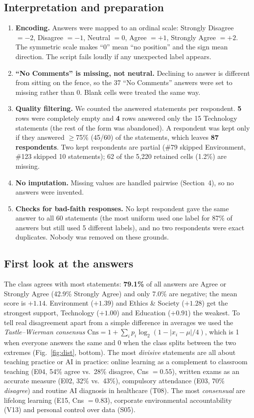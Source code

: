 \documentclass[11pt,a4paper]{article}
\begin{document}
\subsection{Interpretation and preparation}
\begin{enumerate}
\item \textbf{Encoding.} Answers were mapped to an ordinal scale:
Strongly Disagree $=-2$, Disagree $=-1$, Neutral $=0$, Agree $=+1$, Strongly Agree $=+2$.
The symmetric scale makes ``0'' mean ``no position'' and the sign mean direction. The script
fails loudly if any unexpected label appears.
\item \textbf{``No Comments'' is missing, not neutral.} Declining to answer is different from sitting on the
fence, so the 37 ``No Comments'' answers were set to missing rather than 0. Blank cells were treated the same way.
\item \textbf{Quality filtering.} We counted the answered statements per respondent. \textbf{5} rows were
completely empty and \textbf{4} rows answered only the 15 Technology statements (the rest of the form was
abandoned). A respondent was kept only if they answered $\geq$75\% (45/60) of the statements, which leaves
\textbf{87 respondents}. Two kept respondents are partial (\#79 skipped Environment, \#123 skipped 10
statements); 62 of the 5{,}220 retained cells (1.2\%) are missing.
\item \textbf{No imputation.} Missing values are handled pairwise (Section~4), so no answers were invented.
\item \textbf{Checks for bad-faith responses.} No kept respondent gave the same answer to all 60 statements
(the most uniform used one label for 87\% of answers but still used 5 different labels), and no two
respondents were exact duplicates. Nobody was removed on these grounds.
\end{enumerate}

\subsection{First look at the answers}
The class agrees with most statements: \textbf{79.1\%} of all answers are Agree or Strongly Agree
(42.9\% Strongly Agree) and only 7.0\% are negative; the mean score is $+1.14$. Environment ($+1.39$)
and Ethics \& Society ($+1.28$) get the strongest support, Technology ($+1.00$) and Education ($+0.91$)
the weakest. To tell real disagreement apart from a simple difference in averages we used the
\emph{Tastle--Wierman consensus} $\mathrm{Cns}=1+\sum_i p_i\log_2\!\left(1-|x_i-\mu|/4\right)$, which is 1 when
everyone answers the same and 0 when the class splits between the two extremes (Fig.~\ref{fig:dist}, bottom).
The most \emph{divisive} statements are all about teaching practice or AI in practice: online learning as a
complement to classroom teaching (E04, 54\% agree vs.\ 28\% disagree, Cns $=0.55$), written exams as an
accurate measure (E02, 32\% vs.\ 43\%), compulsory attendance (E03, 70\% \emph{disagree}) and routine
AI diagnosis in healthcare (T08). The most \emph{consensual} are lifelong learning (E15, Cns $=0.83$),
corporate environmental accountability (V13) and personal control over data (S05).
\end{document}
